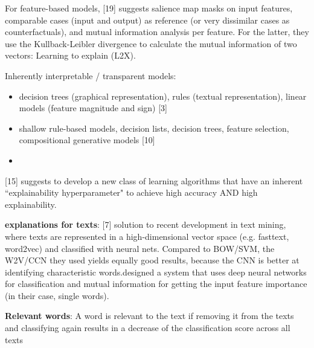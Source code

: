 For feature-based models, [19] suggests salience map masks on input features, comparable cases (input and output) as reference (or very dissimilar cases as counterfactuals), and mutual information analysis per feature. For the latter, they use the Kullback-Leibler divergence to calculate the mutual information of two vectors: Learning to explain (L2X).\newline

Inherently interpretable / transparent models:
\begin{itemize}
	\item decision trees (graphical representation), rules (textual representation), linear models (feature magnitude and sign) [3]
	\item shallow rule-based models, decision lists, decision trees, feature selection, compositional generative models [10]
	\item 
\end{itemize}

[15] suggests to develop a new class of learning algorithms that have an inherent ``explainability hyperparameter" to achieve high accuracy AND high explainability.\newline

\textbf{explanations for texts}:
[7] solution to recent development in text mining, where texts are represented in a high-dimensional vector space (e.g. fasttext, word2vec) and classified with neural nets. Compared to BOW/SVM, the W2V/CCN they used yields equally good results, because the CNN is better at identifying characteristic words.\newline
[19] designed a system that uses deep neural networks for classification and mutual information for getting the input feature importance (in their case, single words). \newline


\textbf{Relevant words}: A word is relevant to the text if removing it from the texts and classifying again results in a decrease of the classification score across all texts

 


